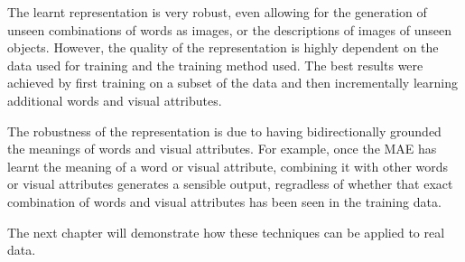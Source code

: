 The learnt representation is very robust, even allowing for the generation of unseen combinations of words as images, or the descriptions of images of unseen objects. However, the quality of the representation is highly dependent on the data used for training and the training method used. The best results were achieved by first training on a subset of the data and then incrementally learning additional words and visual attributes.

The robustness of the representation is due to having bidirectionally grounded the meanings of words and visual attributes. For example, once the \ac{MAE} has learnt the meaning of a word or visual attribute, combining it with other words or visual attributes generates a sensible output, regradless of whether that exact combination of words and visual attributes has been seen in the training data.

The next chapter will demonstrate how these techniques can be applied to real data.


